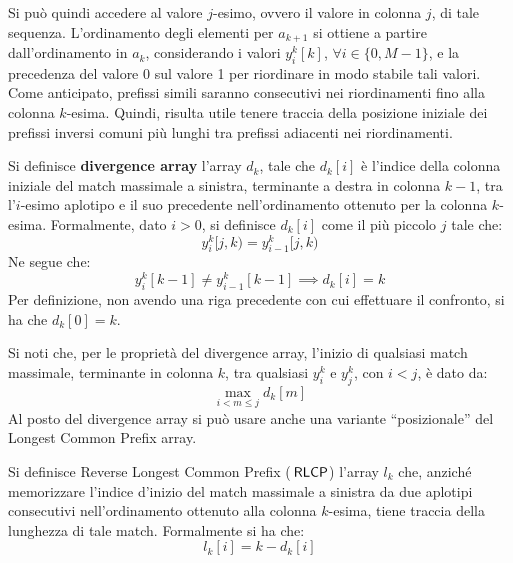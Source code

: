 Si può quindi accedere al valore $j$-esimo, ovvero
il valore in colonna $j$, di tale
sequenza. L'ordinamento degli elementi per
$a_{k+1}$ si ottiene a partire 
dall'ordinamento in $a_k$, considerando i valori $y_i^k[k]$, $\forall
i\in\{0,M-1\}$, e la 
precedenza del valore 0 sul valore 1 per riordinare in modo stabile tali
valori.\\ 
Come anticipato, prefissi simili saranno consecutivi nei riordinamenti fino alla
colonna $k$-esima. Quindi, risulta utile tenere traccia della posizione iniziale
dei prefissi inversi comuni più lunghi tra prefissi adiacenti nei riordinamenti. 
\begin{definizione}
  Si definisce \textbf{divergence array} l'array $d_k$, tale che $d_k[i]$ è
  l'indice della colonna iniziale del match massimale a sinistra, terminante
  a destra in colonna
  $k-1$, tra 
  l'$i$-esimo aplotipo e il suo precedente nell'ordinamento ottenuto per la
  colonna $k$-esima. Formalmente, dato $i>0$, si definisce 
  $d_k[i]$ come il più piccolo $j$ tale che:
  \begin{equation}
    \label{eq:pbwtdiv}
    y_i^k[j,k)=y_{i-1}^k[j,k)
  \end{equation}
  Ne segue che:
  \begin{equation}
    \label{eq:pbwtdiv2}
    y_i^k[k-1]\neq y_{i-1}^k[k-1] \implies d_k[i]=k
  \end{equation}
  Per definizione, non avendo una riga precedente con cui effettuare il
  confronto, si ha che $d_k[0]=k$.
\end{definizione}
Si noti che, per le proprietà del divergence array, l'inizio di qualsiasi match
massimale, terminante 
in colonna $k$, tra qualsiasi $y_i^k$ e $y_j^k$, con $i<j$, è dato da:
\begin{equation}
  \label{eq:pbwtint}
  \max_{i<m\leq j}d_k[m]
\end{equation}
Al posto del divergence array si può usare anche una
variante ``posizionale'' del Longest Common Prefix array.
\begin{definizione}
  Si definisce Reverse Longest Common Prefix ($\,\mbox{\rm {\sf RLCP}}$) l'array $l_k$
  che, anziché 
  memorizzare l'indice d'inizio del match massimale a sinistra da due aplotipi
  consecutivi nell'ordinamento ottenuto alla colonna $k$-esima, tiene traccia
  della lunghezza di tale match. Formalmente si ha che:
  \begin{equation}
    \label{eq:pbwtlcp}
    l_k[i]=k-d_k[i]
  \end{equation}
\end{definizione}
